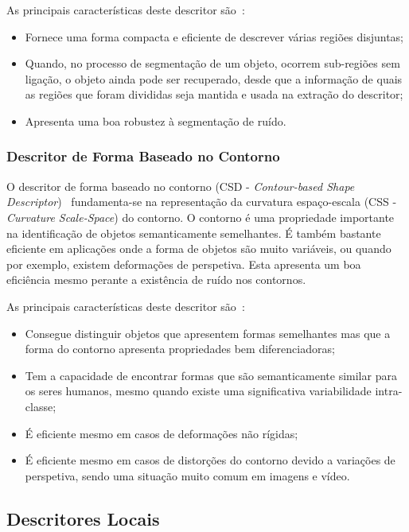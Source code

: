 As principais características deste descritor são~\cite{Bober2001}:

\begin{itemize}
\item Fornece uma forma compacta e eficiente de descrever várias regiões disjuntas;
\item Quando, no processo de segmentação de um objeto, ocorrem sub-regiões sem ligação, o objeto ainda pode ser recuperado, desde que a informação de quais as regiões que foram divididas seja mantida e usada na extração do descritor;
\item Apresenta uma boa robustez à segmentação de ruído.
\end{itemize}

\subsubsection{Descritor de Forma Baseado no Contorno}

O descritor de forma baseado no contorno (CSD - \textit{Contour-based Shape Descriptor})~\cite{Bober2001} fundamenta-se na representação da curvatura espaço-escala (CSS - \textit{Curvature Scale-Space}) do contorno. O contorno é uma propriedade importante na identificação de objetos semanticamente semelhantes. É também bastante eficiente em aplicações onde a forma de objetos são muito variáveis, ou quando por exemplo, existem deformações de perspetiva. Esta apresenta um boa eficiência mesmo perante a existência de ruído nos contornos. 

As principais características deste descritor são~\cite{Bober2001}: 

\begin{itemize}
\item Consegue distinguir objetos que apresentem formas semelhantes mas que a forma do contorno apresenta propriedades bem diferenciadoras;
\item Tem a capacidade de encontrar formas que são semanticamente similar para os seres humanos, mesmo quando existe uma significativa variabilidade intra-classe;
\item É eficiente mesmo em casos de deformações não rígidas;
\item É eficiente mesmo em casos de distorções do contorno devido a variações de perspetiva, sendo uma situação muito comum em imagens e vídeo.
\end{itemize}

\subsection{Descritores Locais}

